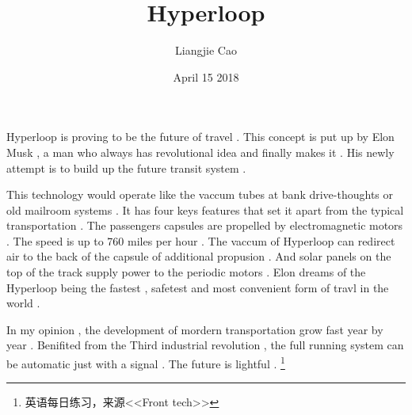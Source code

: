 \documentclass[50pt]{article}
\begin{document}
\title{Hyperloop}
\author{Liangjie Cao}
\date{April 15 2018}
\maketitle
\par
Hyperloop is proving to be the future of travel . This concept is put up by Elon Musk , a man who always has revolutional idea and finally makes it . His newly attempt is to build up the future transit system . \\
\par
This technology would operate like the vaccum tubes at bank drive-thoughts or old mailroom systems . It has four keys features that set it apart from the typical transportation . The passengers capsules are propelled by electromagnetic motors . The speed is up to 760 miles per hour . The vaccum of Hyperloop can redirect air to the back of the capsule of additional propusion . And solar panels on the top of the track supply power to the periodic motors . Elon dreams of the Hyperloop being the fastest , safetest and most convenient form of travl in the world . \\
\par
In my opinion , the development of mordern transportation grow fast year by year . Benifited from the Third industrial revolution , the full running system can be automatic just with a signal . The future is lightful .
\footnote{\centering 英语每日练习，来源<<Front tech>>}
\end{document}
